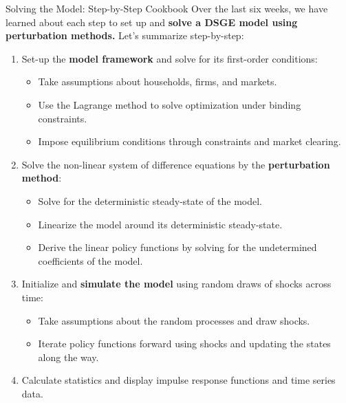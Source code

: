 \documentclass[10pt,c,aspectratio=1610,handout]{beamer}
\begin{document}
\begin{frame}{Solving the Model: Step-by-Step Cookbook}%
  Over the last six weeks, we have learned about each step to set up and \textbf{solve a DSGE model using perturbation methods.} Let's summarize step-by-step:%
  \pause%
  \begin{enumerate}%
    \item Set-up the \textbf{model framework} and solve for its first-order conditions:%
    \begin{itemize}%
      \item[$\rightarrow$] Take assumptions about households, firms, and markets.%
      \item[$\rightarrow$] Use the Lagrange method to solve optimization under binding constraints.%
      \item[$\rightarrow$] Impose equilibrium conditions through constraints and market clearing.%
    \end{itemize}%
    \pause%
    \item Solve the non-linear system of difference equations by the \textbf{perturbation method}:%
    \begin{itemize}%
      \item[$\rightarrow$] Solve for the deterministic steady-state of the model.%
      \item[$\rightarrow$] Linearize the model around its deterministic steady-state.%
      \item[$\rightarrow$] Derive the linear policy functions by solving for the undetermined coefficients of the model.%
    \end{itemize}%
    \pause%
    \item Initialize and \textbf{simulate the model} using random draws of shocks across time:%
    \begin{itemize}%
      \item[$\rightarrow$] Take assumptions about the random processes and draw shocks.%
      \item[$\rightarrow$] Iterate policy functions forward using shocks and updating the states along the way.%
    \end{itemize}%
    \pause%
    \item Calculate statistics and display impulse response functions and time series data.%
  \end{enumerate}%
\end{frame}%
\end{document}
